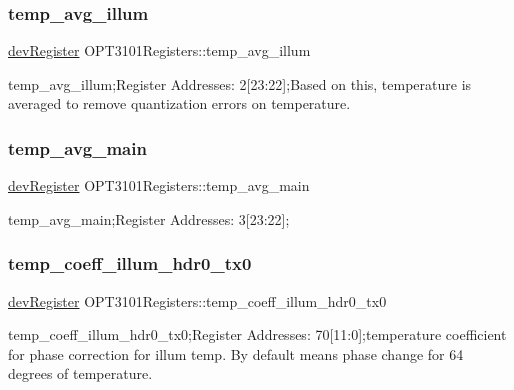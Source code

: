 \subsubsection{\texorpdfstring{temp\+\_\+avg\+\_\+illum}{temp\_avg\_illum}}
{\footnotesize\ttfamily \mbox{\hyperlink{classdev_register}{dev\+Register}} O\+P\+T3101\+Registers\+::temp\+\_\+avg\+\_\+illum}



temp\+\_\+avg\+\_\+illum;Register Addresses\+: 2\mbox{[}23\+:22\mbox{]};Based on this, temperature is averaged to remove quantization errors on temperature. 

\mbox{\label{class_o_p_t3101_registers_ad0db66a039e2db4366a425625bafd68f}} 
\subsubsection{\texorpdfstring{temp\+\_\+avg\+\_\+main}{temp\_avg\_main}}
{\footnotesize\ttfamily \mbox{\hyperlink{classdev_register}{dev\+Register}} O\+P\+T3101\+Registers\+::temp\+\_\+avg\+\_\+main}



temp\+\_\+avg\+\_\+main;Register Addresses\+: 3\mbox{[}23\+:22\mbox{]}; 

\mbox{\label{class_o_p_t3101_registers_a02450b3a7e704a15f237daaeb6c7e1a9}} 
\subsubsection{\texorpdfstring{temp\+\_\+coeff\+\_\+illum\+\_\+hdr0\+\_\+tx0}{temp\_coeff\_illum\_hdr0\_tx0}}
{\footnotesize\ttfamily \mbox{\hyperlink{classdev_register}{dev\+Register}} O\+P\+T3101\+Registers\+::temp\+\_\+coeff\+\_\+illum\+\_\+hdr0\+\_\+tx0}



temp\+\_\+coeff\+\_\+illum\+\_\+hdr0\+\_\+tx0;Register Addresses\+: 70\mbox{[}11\+:0\mbox{]};temperature coefficient for phase correction for illum temp. By default means phase change for 64 degrees of temperature. 

